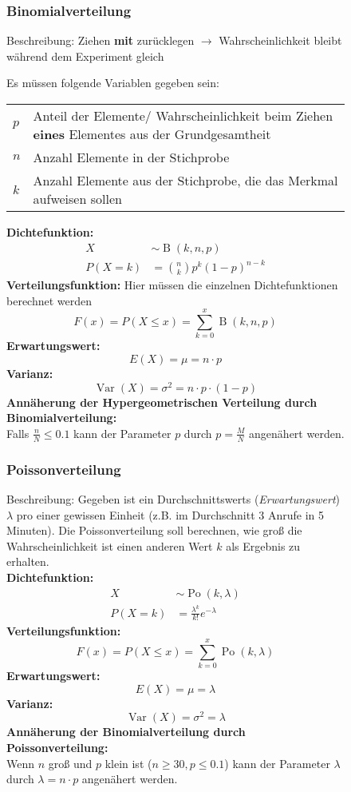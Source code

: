 \documentclass[12pt, a4paper, twoside]{scrreprt}
\begin{document}
\begin{figure}[H]
  \subsubsection{Binomialverteilung}
Beschreibung: Ziehen \textbf{mit} zurücklegen $\rightarrow$ Wahrscheinlichkeit bleibt während dem Experiment gleich

  Es müssen folgende Variablen gegeben sein:

  \begin{tabularx}{\textwidth}{lX}
    \toprule
    \(p\) & Anteil der Elemente/ Wahrscheinlichkeit beim Ziehen \textbf{eines} Elementes aus der Grundgesamtheit\\
    \(n\) & Anzahl Elemente in der Stichprobe\\
    \(k\) & Anzahl Elemente aus der Stichprobe, die das Merkmal aufweisen sollen\\
    \bottomrule
  \end{tabularx}

  \textbf{Dichtefunktion:}
  \begin{align*}
    X &\sim \operatorname{B}(k,n,p)\\[1em]
    P(X = k) &= \binom{n}{k}p^k{(1 - p)}^{n-k}
  \end{align*}
  \textbf{Verteilungsfunktion:}
  Hier müssen die einzelnen Dichtefunktionen berechnet werden
  \[F(x) = P(X \leq x) = \sum_{k=0}^x\operatorname{B}(k,n,p)\]
  \textbf{Erwartungswert:}
  \[E(X) = \mu = n \cdot p\]
  \textbf{Varianz:}
  \[\operatorname{Var}(X) = \sigma^2 = n \cdot p \cdot (1 - p)\]
  \textbf{Annäherung der Hypergeometrischen Verteilung durch Binomialverteilung:}\\
  Falls \(\frac{n}{N} \leq 0.1\) kann der Parameter \(p\) durch \(p = \frac{M}{N}\) angenähert werden.
\end{figure}

\begin{figure}[H]
  \subsubsection{Poissonverteilung}
  Beschreibung: Gegeben ist ein Durchschnittswerts (\textit{Erwartungswert}) \(\lambda\) pro einer gewissen Einheit (z.B. im Durchschnitt 3 Anrufe in 5 Minuten). Die Poissonverteilung soll berechnen, wie groß die Wahrscheinlichkeit ist einen anderen Wert \(k\) als Ergebnis zu erhalten.\\
  \textbf{Dichtefunktion:}
  \begin{align*}
    X & \sim \operatorname{Po}(k, \lambda)\\[1em]
    P(X = k) & = \frac{\lambda^k}{k!}e^{-\lambda}
  \end{align*}
  \textbf{Verteilungsfunktion:}
  \[F(x) = P(X \leq x) = \sum_{k=0}^x\operatorname{Po}(k,\lambda)\]
  \textbf{Erwartungswert:}
  \[E(X) = \mu = \lambda\]
  \textbf{Varianz:}
  \[\operatorname{Var}(X) = \sigma^2 = \lambda\]
  \textbf{Annäherung der Binomialverteilung durch Poissonverteilung:}\\
  Wenn \(n\) groß und \(p\) klein ist (\(n \geq 30, p \leq 0.1\)) kann der Parameter \(\lambda\) durch \(\lambda = n \cdot p\) angenähert werden.
\end{figure}
\end{document}
